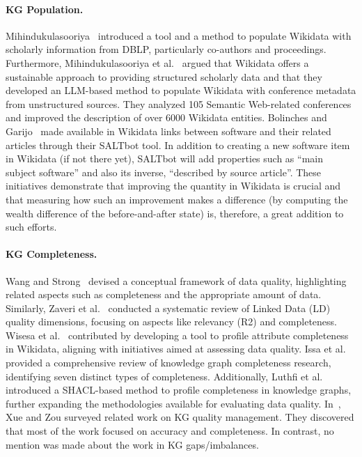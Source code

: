 \paragraph{KG Population.}
Mihindukulasooriya~\cite{Mihindukulasooriya24} introduced a tool and a method to populate Wikidata with scholarly information from DBLP, particularly co-authors and proceedings.
Furthermore, Mihindukulasooriya et al.~\cite{MihindukulasooriyaTDNCP24} argued that Wikidata offers a sustainable approach to providing structured scholarly data and that they developed an LLM-based method to populate Wikidata with conference metadata from unstructured sources.
They analyzed 105 Semantic Web-related conferences and improved the description of over 6000 Wikidata entities. Bolinches and Garijo~\cite{BolinchesG23} made available in Wikidata links between software and their related articles through their SALTbot tool. In addition to creating a new software item in Wikidata (if not there yet), SALTbot will add properties such as ``main subject software'' and also its inverse, ``described by source article''. These initiatives demonstrate that improving the quantity in Wikidata is crucial and that measuring how such an improvement makes a difference (by computing the wealth difference of the before-and-after state) is, therefore, a great addition to such efforts.

\paragraph{KG Completeness.} Wang and Strong~\cite{WangS96} devised a conceptual framework of data quality, highlighting related aspects such as completeness and the appropriate amount of data. Similarly, Zaveri et al.~\cite{ZaveriRMPLA16} conducted a systematic review of Linked Data (LD) quality dimensions, focusing on aspects like relevancy (R2) and completeness.
Wisesa et al.~\cite{WisesaDKNR19} contributed by developing a tool to profile attribute completeness in Wikidata, aligning with initiatives aimed at assessing data quality.
Issa et al.~\cite{IssaAHCDZ21} provided a comprehensive review of knowledge graph completeness research, identifying seven distinct types of completeness.
Additionally, Luthfi et al.~\cite{LuthfiDA22} introduced a SHACL-based method to profile completeness in knowledge graphs, further expanding the methodologies available for evaluating data quality.
In~\cite{XueZ23}, Xue and Zou surveyed related work on KG quality management. They discovered that most of the work focused on accuracy and completeness. In contrast, no mention was made about the work in KG gaps/imbalances.

